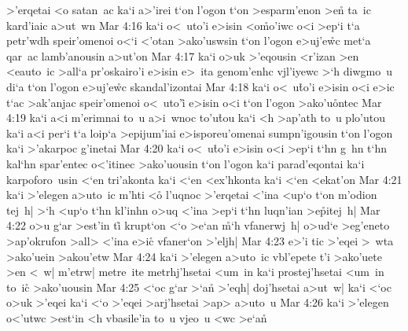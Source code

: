 >'erqetai
<o
satan~ac
ka`i
a>'irei
t`on
l'ogon
t`on
>esparm'enon
>en\r{}
ta~ic
kard'iaic
a>ut~wn\bibvsend
\vs Mar 4:16
ka`i
o<~uto'i
e>isin
<o\r{m}o'iwc
o<i
>ep`i
t`a
petr'wdh
speir'omenoi
o<`i
<'otan
>ako'uswsin
t`on
l'ogon
e>uj'e\r{w}c
met`a
qar~ac
lamb'anousin
a>ut'on\bibvsend
\vs Mar 4:17
ka`i
o>uk
>'eqousin
<r'izan
>en
<eauto~ic
>all`a
pr'oskairo'i
e>isin
e>~ita
genom'enhc
vjl'iyewc
>`h
diwgmo~u
di`a
t`on
l'ogon
e>uj'e\r{w}c
skandal'izontai\bibvsend
\vs Mar 4:18
ka`i
o<~u\r{t}o'i
e>isin
o<i
e>ic
t`ac
>ak'anjac
speir'omenoi
o<~uto'i\r{}
e>isin
o<i
t`on
l'ogon
>ako'u\r{o}ntec\bibvsend
{}
\vs Mar 4:19
ka`i
a<i
m'erimnai
to~u
a>i~wnoc
to'u\r{t}ou
ka`i
<h
>ap'ath
to~u
plo'utou
ka`i
a<i
per`i
t`a
loip`a
>epijum'iai
e>isporeu'omenai
sumpn'igousin
t`on
l'ogon
ka`i
>'akarpoc
g'inetai\bibvsend
\vs Mar 4:20
ka`i
o<~u\r{t}o'i
e>isin
o<i
>ep`i
t`hn
g~hn
t`hn
kal`hn
spar'entec
o<'itinec
>ako'uousin
t`on
l'ogon
ka`i
parad'eqontai
ka`i
karpoforo~usin
<`en
tri'akonta
ka`i
<`en
<ex'hkonta
ka`i
<`en
<ekat'on\bibvsend
\vs Mar 4:21
ka`i
>'elegen
a>uto~ic
m'hti
<o\r{}
l'uqnoc
>'erqetai
<'ina
<up`o
t`on
m'odion
tej~h|
>`h
<up`o
t`hn
kl'inhn
o>uq
<'ina
>ep`i
t`hn
luqn'ian
>e\r{p}itej~h|\bibvsend
{}
\vs Mar 4:22
o>u
g`ar
>est'in
ti\r{}
krupt`on
<`o
>e`an
\r{m}`h
vfanerwj~h|
o>ud`e
>eg'eneto
>ap'okrufon
>all>
<'ina
e>ic\r{}
vfaner`on
>'eljh|\bibvsend
\vs Mar 4:23
e>'i
tic
>'eqei
>~wta
>ako'uein
>akou'etw\bibvsend
\vs Mar 4:24
ka`i
>'elegen
a>uto~ic
vbl'epete
t'i
>ako'uete
>en
<~w|
m'etrw|
metre~ite
metrhj'hsetai
<um~in
ka`i
prostej'hsetai
<um~in
to~ic\r{}
>ako'uousin\bibvsend
\vs Mar 4:25
<`oc
g`ar
>`an\r{}
>'eqh|
doj'hsetai
a>ut~w|
ka`i
<`oc
o>uk
>'eqei
ka`i
<`o
>'eqei
>arj'hsetai
>ap>
a>uto~u\bibvsend
\vs Mar 4:26
ka`i
>'elegen
o<'utwc
>est`in
<h
vbasile'ia
to~u
vjeo~u
<wc
>e`a\r{n}
